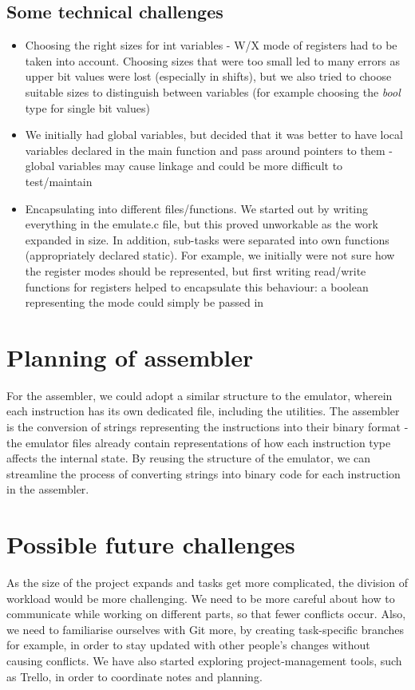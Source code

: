 \documentclass{article}
\begin{document}
\subsection{Some technical challenges}
\begin{itemize}
  \item Choosing the right sizes for int variables - W/X mode of registers had to be taken into account. Choosing sizes that were too small led to many errors as upper bit values were lost (especially in shifts), but we also tried to choose suitable sizes to distinguish between variables (for example choosing the \emph{bool} type for single bit values)
  \item We initially had global variables, but decided that it was better to have local variables declared in the main function and pass around pointers to them - global variables may cause linkage and could be more difficult to test/maintain
  \item Encapsulating into different files/functions. We started out by writing everything in the emulate.c file, but this proved unworkable as the work expanded in size. In addition, sub-tasks were separated into own functions (appropriately declared static). For example, we initially were not sure how the register modes should be represented, but first writing read/write functions for registers helped to encapsulate this behaviour: a boolean representing the mode could simply be passed in
\end{itemize}

\section{Planning of assembler}

For the assembler, we could adopt a similar structure to the emulator, wherein each instruction has its own dedicated file, including the utilities. The assembler is the conversion of strings representing the instructions into their binary format - the emulator files already contain representations of how each instruction type affects the internal state. By reusing the structure of the emulator, we can streamline the process of converting strings into binary code for each instruction in the assembler.

\section{Possible future challenges}

As the size of the project expands and tasks get more complicated, the division of workload would be more challenging. We need to be more careful about how to communicate while working on different parts, so that fewer conflicts occur. Also, we need to familiarise ourselves with Git more, by creating task-specific branches for example, in order to stay updated with other people’s changes without causing conflicts. We have also started exploring project-management tools, such as Trello, in order to coordinate notes and planning. 
\end{document}
